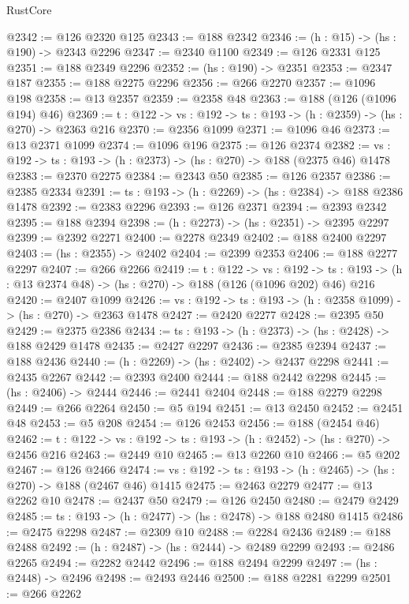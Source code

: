 \begin{lexlean}{RustCore}
\begin{coremodule}
@2342 := @126 @2320 @125
@2343 := @188 @2342
@2346 := (h : @15) -> (hs : @190) -> @2343 @2296
@2347 := @2340 @1100
@2349 := @126 @2331 @125
@2351 := @188 @2349 @2296
@2352 := (hs : @190) -> @2351
@2353 := @2347 @187
@2355 := @188 @2275 @2296
@2356 := @266 @2270
@2357 := @1096 @198
@2358 := @13 @2357
@2359 := @2358 @48
@2363 := @188 (@126 (@1096 @194) @46)
@2369 := {t : @122} -> {vs : @192} -> {ts : @193} -> (h : @2359) -> (hs : @270) -> @2363 @216
@2370 := @2356 @1099
@2371 := @1096 @46
@2373 := @13 @2371 @1099
@2374 := @1096 @196
@2375 := @126 @2374
@2382 := {vs : @192} -> {ts : @193} -> (h : @2373) -> (hs : @270) -> @188 (@2375 @46) @1478
@2383 := @2370 @2275
@2384 := @2343 @50
@2385 := @126 @2357
@2386 := @2385 @2334
@2391 := {ts : @193} -> (h : @2269) -> (hs : @2384) -> @188 @2386 @1478
@2392 := @2383 @2296
@2393 := @126 @2371
@2394 := @2393 @2342
@2395 := @188 @2394
@2398 := (h : @2273) -> (hs : @2351) -> @2395 @2297
@2399 := @2392 @2271
@2400 := @2278 @2349
@2402 := @188 @2400 @2297
@2403 := (hs : @2355) -> @2402
@2404 := @2399 @2353
@2406 := @188 @2277 @2297
@2407 := @266 @2266
@2419 := {t : @122} ->
  {vs : @192} ->
  {ts : @193} -> (h : @13 @2374 @48) -> (hs : @270) -> @188 (@126 (@1096 @202) @46) @216
@2420 := @2407 @1099
@2426 := {vs : @192} -> {ts : @193} -> (h : @2358 @1099) -> (hs : @270) -> @2363 @1478
@2427 := @2420 @2277
@2428 := @2395 @50
@2429 := @2375 @2386
@2434 := {ts : @193} -> (h : @2373) -> (hs : @2428) -> @188 @2429 @1478
@2435 := @2427 @2297
@2436 := @2385 @2394
@2437 := @188 @2436
@2440 := (h : @2269) -> (hs : @2402) -> @2437 @2298
@2441 := @2435 @2267
@2442 := @2393 @2400
@2444 := @188 @2442 @2298
@2445 := (hs : @2406) -> @2444
@2446 := @2441 @2404
@2448 := @188 @2279 @2298
@2449 := @266 @2264
@2450 := @5 @194
@2451 := @13 @2450
@2452 := @2451 @48
@2453 := @5 @208
@2454 := @126 @2453
@2456 := @188 (@2454 @46)
@2462 := {t : @122} -> {vs : @192} -> {ts : @193} -> (h : @2452) -> (hs : @270) -> @2456 @216
@2463 := @2449 @10
@2465 := @13 @2260 @10
@2466 := @5 @202
@2467 := @126 @2466
@2474 := {vs : @192} -> {ts : @193} -> (h : @2465) -> (hs : @270) -> @188 (@2467 @46) @1415
@2475 := @2463 @2279
@2477 := @13 @2262 @10
@2478 := @2437 @50
@2479 := @126 @2450
@2480 := @2479 @2429
@2485 := {ts : @193} -> (h : @2477) -> (hs : @2478) -> @188 @2480 @1415
@2486 := @2475 @2298
@2487 := @2309 @10
@2488 := @2284 @2436
@2489 := @188 @2488
@2492 := (h : @2487) -> (hs : @2444) -> @2489 @2299
@2493 := @2486 @2265
@2494 := @2282 @2442
@2496 := @188 @2494 @2299
@2497 := (hs : @2448) -> @2496
@2498 := @2493 @2446
@2500 := @188 @2281 @2299
@2501 := @266 @2262

\end{coremodule}
\end{lexlean}

